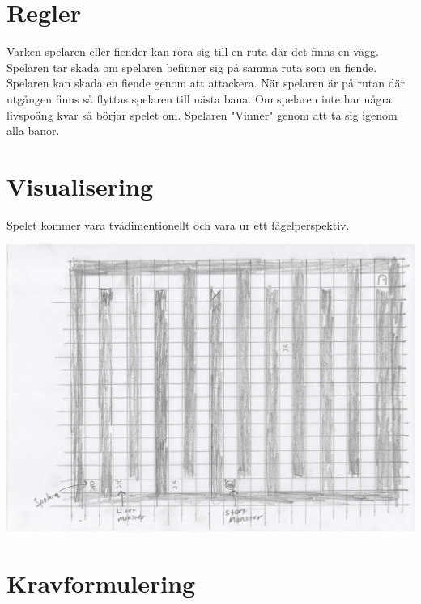 \documentclass{TDP005mall}
\begin{document}
\section{Regler}
Varken spelaren eller fiender kan röra sig till en ruta där det finns en vägg.
Spelaren tar skada om spelaren befinner sig på samma ruta som en fiende.
Spelaren kan skada en fiende genom att attackera.
När spelaren är på rutan där utgången finns så flyttas spelaren till nästa bana.
Om spelaren inte har några livspoäng kvar så börjar spelet om.
Spelaren "Vinner" genom att ta sig igenom alla banor.

\newpage
\section{Visualisering}
Spelet kommer vara tvådimentionellt och vara ur ett fågelperspektiv.

\includegraphics[scale=0.5]{Spelskiss}

\newpage
\section{Kravformulering}
\end{document}
